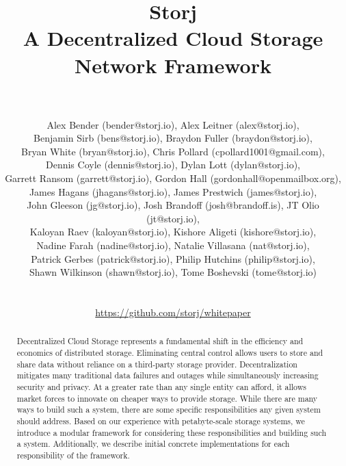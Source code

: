 \documentclass[a4paper,10pt]{article} \usepackage[utf8]{inputenc}
\title{\textbf{Storj\\A Decentralized Cloud Storage Network Framework}}
\author{\\ \parbox{\linewidth}{\centering\small Alex Bender (bender@storj.io),
Alex Leitner (alex@storj.io),\\ Benjamin Sirb (bens@storj.io), Braydon Fuller
(braydon@storj.io),\\ Bryan White (bryan@storj.io), Chris Pollard
(cpollard1001@gmail.com),\\ Dennis Coyle (dennis@storj.io), Dylan Lott
(dylan@storj.io),\\ Garrett Ransom (garrett@storj.io), Gordon Hall
(gordonhall@openmailbox.org),\\ James Hagans (jhagans@storj.io), James Prestwich
(james@storj.io),\\ John Gleeson (jg@storj.io), Josh Brandoff
(josh@brandoff.is), JT Olio (jt@storj.io),\\ Kaloyan Raev (kaloyan@storj.io),
Kishore Aligeti (kishore@storj.io),\\ Nadine Farah (nadine@storj.io), Natalie
Villasana (nat@storj.io),\\ Patrick Gerbes (patrick@storj.io), Philip Hutchins
(philip@storj.io),\\ Shawn Wilkinson (shawn@storj.io), Tome Boshevski
(tome@storj.io)}\\\\\small \url{https://github.com/storj/whitepaper} }\date
\begin{document}
\maketitle

\begin{abstract}

Decentralized Cloud Storage represents a fundamental shift in
the efficiency and economics of distributed storage.
Eliminating central control allows users to store and share data
without reliance on a third-party storage provider. Decentralization mitigates
many traditional data failures and outages while simultaneously increasing
security and privacy. At a greater rate than any single entity can afford, it allows
market forces to innovate on cheaper ways to provide storage. While there
are many ways to build such a system, there are some specific responsibilities
any given system should address. Based on our experience with petabyte-scale
storage systems, we introduce a modular framework for considering these
responsibilities and building such a system. Additionally, we describe initial concrete
implementations for each responsibility of the framework. \end{abstract}
\end{document}
